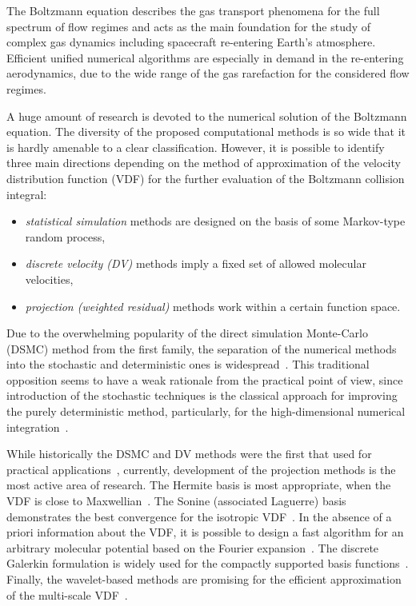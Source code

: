 \documentclass{aip-cp}
\begin{document}
The Boltzmann equation describes the gas transport phenomena for the full spectrum of flow regimes
and acts as the main foundation for the study of complex gas dynamics including spacecraft re-entering Earth’s atmosphere.
Efficient unified numerical algorithms are especially in demand in the re-entering aerodynamics,
due to the wide range of the gas rarefaction for the considered flow regimes.

A huge amount of research is devoted to the numerical solution of the Boltzmann equation.
The diversity of the proposed computational methods is so wide that it is hardly amenable to a clear classification.
However, it is possible to identify three main directions
depending on the method of approximation of the velocity distribution function (VDF)
for the further evaluation of the Boltzmann collision integral:
\begin{itemize}
    \item \emph{statistical simulation} methods are designed on the basis of some Markov-type random process,
    \item \emph{discrete velocity (DV)} methods imply a fixed set of allowed molecular velocities,
    \item \emph{projection (weighted residual)} methods work within a certain function space.
\end{itemize}
Due to the overwhelming popularity of the direct simulation Monte-Carlo (DSMC) method from the first family,
the separation of the numerical methods into the stochastic and deterministic ones is widespread~\cite{Mieussens2014}.
This traditional opposition seems to have a weak rationale from the practical point of view,
since introduction of the stochastic techniques is the classical approach for improving the purely deterministic method,
particularly, for the high-dimensional numerical integration~\cite{Dick2013}.

While historically the DSMC and DV methods were the first that used for practical applications~\cite{Bird1963, Nordsieck1966},
currently, development of the projection methods is the most active area of research.
The Hermite basis is most appropriate, when the VDF is close to Maxwellian~\cite{Gobbert2007}.
The Sonine (associated Laguerre) basis demonstrates the best convergence for the isotropic VDF~\cite{Fonn2014}.
In the absence of a priori information about the VDF,
it is possible to design a fast algorithm for an arbitrary molecular potential based on the Fourier expansion~\cite{Wu2015}.
The discrete Galerkin formulation is widely used for the compactly supported basis functions~\cite{Majorana2011, Alekseenko2014, Kitzler2015}.
Finally, the wavelet-based methods are promising for the efficient approximation of the multi-scale VDF~\cite{Tran2013}.
\end{document}

